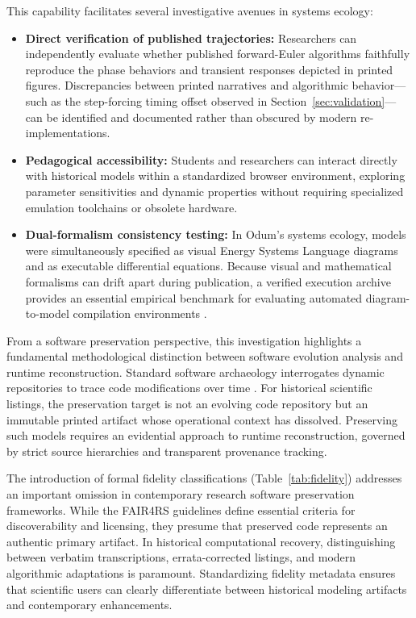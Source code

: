 \documentclass[3p,times,authoryear,twocolumn]{elsarticle}
\begin{document}
This capability facilitates several investigative avenues in systems ecology:
\begin{itemize}
\item \textbf{Direct verification of published trajectories:} Researchers can independently evaluate whether published forward-Euler algorithms faithfully reproduce the phase behaviors and transient responses depicted in printed figures. Discrepancies between printed narratives and algorithmic behavior—such as the step-forcing timing offset observed in Section~\ref{sec:validation}—can be identified and documented rather than obscured by modern re-implementations.
\item \textbf{Pedagogical accessibility:} Students and researchers can interact directly with historical models within a standardized browser environment, exploring parameter sensitivities and dynamic properties without requiring specialized emulation toolchains or obsolete hardware.
\item \textbf{Dual-formalism consistency testing:} In Odum's systems ecology, models were simultaneously specified as visual Energy Systems Language diagrams and as executable differential equations. Because visual and mathematical formalisms can drift apart during publication, a verified execution archive provides an essential empirical benchmark for evaluating automated diagram-to-model compilation environments \citep{energese,gssk}.
\end{itemize}

From a software preservation perspective, this investigation highlights a fundamental methodological distinction between software evolution analysis and runtime reconstruction. Standard software archaeology interrogates dynamic repositories to trace code modifications over time \citep{huntThomas2002,robles2005,spinellis2021}. For historical scientific listings, the preservation target is not an evolving code repository but an immutable printed artifact whose operational context has dissolved. Preserving such models requires an evidential approach to runtime reconstruction, governed by strict source hierarchies and transparent provenance tracking.

The introduction of formal fidelity classifications (Table~\ref{tab:fidelity}) addresses an important omission in contemporary research software preservation frameworks. While the FAIR4RS guidelines \citep{barker2022} define essential criteria for discoverability and licensing, they presume that preserved code represents an authentic primary artifact. In historical computational recovery, distinguishing between verbatim transcriptions, errata-corrected listings, and modern algorithmic adaptations is paramount. Standardizing fidelity metadata ensures that scientific users can clearly differentiate between historical modeling artifacts and contemporary enhancements.
\end{document}
